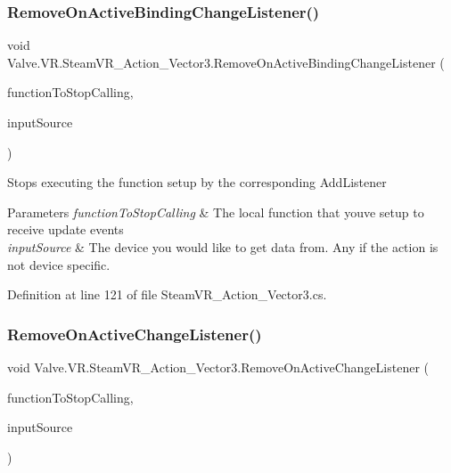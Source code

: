 \subsubsection{\texorpdfstring{RemoveOnActiveBindingChangeListener()}{RemoveOnActiveBindingChangeListener()}}
{\footnotesize\ttfamily void Valve.\+V\+R.\+Steam\+V\+R\+\_\+\+Action\+\_\+\+Vector3.\+Remove\+On\+Active\+Binding\+Change\+Listener (\begin{DoxyParamCaption}\item[{\mbox{\hyperlink{class_valve_1_1_v_r_1_1_steam_v_r___action___vector3_a47d6c1c558fb45841cd626df9ab3dcb9}{Active\+Change\+Handler}}}]{function\+To\+Stop\+Calling,  }\item[{\mbox{\hyperlink{namespace_valve_1_1_v_r_a82e5bf501cc3aa155444ee3f0662853f}{Steam\+V\+R\+\_\+\+Input\+\_\+\+Sources}}}]{input\+Source }\end{DoxyParamCaption})}



Stops executing the function setup by the corresponding Add\+Listener 


\begin{DoxyParams}{Parameters}
{\em function\+To\+Stop\+Calling} & The local function that you\textquotesingle{}ve setup to receive update events\\
\hline
{\em input\+Source} & The device you would like to get data from. Any if the action is not device specific.\\
\hline
\end{DoxyParams}


Definition at line 121 of file Steam\+V\+R\+\_\+\+Action\+\_\+\+Vector3.\+cs.

\mbox{\label{class_valve_1_1_v_r_1_1_steam_v_r___action___vector3_a594c49794c1103f0bb8c2db3c305e577}} 
\subsubsection{\texorpdfstring{RemoveOnActiveChangeListener()}{RemoveOnActiveChangeListener()}}
{\footnotesize\ttfamily void Valve.\+V\+R.\+Steam\+V\+R\+\_\+\+Action\+\_\+\+Vector3.\+Remove\+On\+Active\+Change\+Listener (\begin{DoxyParamCaption}\item[{\mbox{\hyperlink{class_valve_1_1_v_r_1_1_steam_v_r___action___vector3_a47d6c1c558fb45841cd626df9ab3dcb9}{Active\+Change\+Handler}}}]{function\+To\+Stop\+Calling,  }\item[{\mbox{\hyperlink{namespace_valve_1_1_v_r_a82e5bf501cc3aa155444ee3f0662853f}{Steam\+V\+R\+\_\+\+Input\+\_\+\+Sources}}}]{input\+Source }\end{DoxyParamCaption})}



